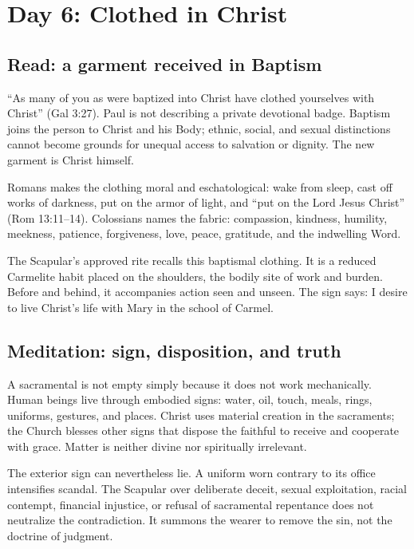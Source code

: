 \section{Day 6: Clothed in Christ}


\subsection{Read: a garment received in Baptism}

``As many of you as were baptized into Christ have clothed yourselves with Christ'' (Gal 3:27). Paul is not describing a private devotional badge. Baptism joins the person to Christ and his Body; ethnic, social, and sexual distinctions cannot become grounds for unequal access to salvation or dignity. The new garment is Christ himself.

Romans makes the clothing moral and eschatological: wake from sleep, cast off works of darkness, put on the armor of light, and ``put on the Lord Jesus Christ'' (Rom 13:11--14). Colossians names the fabric: compassion, kindness, humility, meekness, patience, forgiveness, love, peace, gratitude, and the indwelling Word.

The Scapular's approved rite recalls this baptismal clothing. It is a reduced Carmelite habit placed on the shoulders, the bodily site of work and burden. Before and behind, it accompanies action seen and unseen. The sign says: I desire to live Christ's life with Mary in the school of Carmel.

\subsection{Meditation: sign, disposition, and truth}

A sacramental is not empty simply because it does not work mechanically. Human beings live through embodied signs: water, oil, touch, meals, rings, uniforms, gestures, and places. Christ uses material creation in the sacraments; the Church blesses other signs that dispose the faithful to receive and cooperate with grace. Matter is neither divine nor spiritually irrelevant.

The exterior sign can nevertheless lie. A uniform worn contrary to its office intensifies scandal. The Scapular over deliberate deceit, sexual exploitation, racial contempt, financial injustice, or refusal of sacramental repentance does not neutralize the contradiction. It summons the wearer to remove the sin, not the doctrine of judgment.

